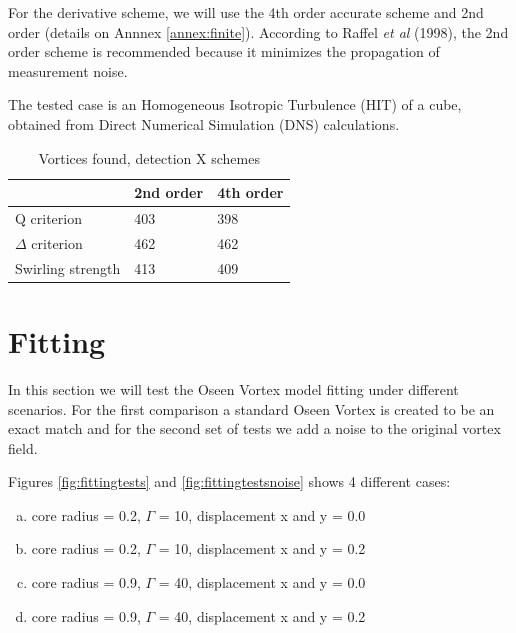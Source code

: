 \documentclass[12pt, a4paper, openany]{memoir}
\begin{document}
For the derivative scheme, we will use the 4th order accurate scheme and 2nd order (details on Annnex \ref{annex:finite}). According to Raffel \textit{et al} (1998), the 2nd order scheme is recommended because it minimizes the propagation of measurement noise.   

The tested case is an Homogeneous Isotropic Turbulence (HIT) of a cube, obtained from Direct Numerical Simulation (DNS) calculations.

\begin{table}[h]
	\centering
	\caption{Vortices found, detection X schemes}
	\vspace{10px}
	\label{tb:detection}
	\begin{tabular}{l|l|l}
		         & 2nd order      & 4th order  \\
		\hline
		Q criterion  & 403  & 398  \\
		$\Delta$ criterion & 462  & 462 \\
		Swirling strength    & 413  & 409
	\end{tabular}
\end{table}

\section{Fitting}

In this section we will test the Oseen Vortex model fitting under different scenarios. For the first comparison a standard Oseen Vortex is created to be an exact match and for the second set of tests we add a noise to the original vortex field.

Figures \ref{fig:fittingtests} and \ref{fig:fittingtestsnoise} shows 4 different cases:
\begin{enumerate}[(a)]
	\item core radius = 0.2, $\Gamma$ = 10, displacement x and y = 0.0
	\item core radius = 0.2, $\Gamma$ = 10, displacement x and y = 0.2
	\item core radius = 0.9, $\Gamma$ = 40, displacement x and y = 0.0
	\item core radius = 0.9, $\Gamma$ = 40, displacement x and y = 0.2  
\end{enumerate}
\end{document}
